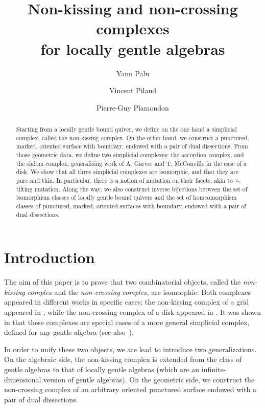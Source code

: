 \documentclass{amsart}
\title[Non-kissing and non-crossing complexes for locally gentle algebras]{Non-kissing and non-crossing complexes \\ for locally gentle algebras}
\author{Yann Palu}
\author{Vincent Pilaud}
\author{Pierre-Guy Plamondon}
\theoremstyle{definition}
\begin{document}
\begin{abstract}
Starting from a locally gentle bound quiver, we define on the one hand a simplicial complex, called the non-kissing complex.
On the other hand, we construct a punctured, marked, oriented surface with boundary, endowed with a pair of dual dissections.
From those geometric data, we define two simplicial complexes: the accordion complex, and the slalom complex, generalising work of A. Garver and T. McConville in the case of a disk.
We show that all three simplicial complexes are isomorphic, and that they are pure and thin.
In particular, there is a notion of mutation on their facets, akin to $\tau$-tilting mutation.
Along the way, we also construct inverse bijections between the set of isomorphism classes of locally gentle bound quivers and the set of homeomorphism classes of punctured, marked, oriented surfaces with boundary, endowed with a pair of dual dissections.
\end{abstract}


\maketitle

\section{Introduction}
The aim of this paper is to prove that two combinatorial objects, called the \emph{non-kissing complex} and the \emph{non-crossing complex}, are isomorphic.
Both complexes appeared in different works in specific cases: the non-kissing complex of a grid appeared in \cite{McConville}, while the non-crossing complex of a disk appeared in \cite{GarverMcConville, MannevillePilaud-accordion}.
It was shown in \cite{PaluPilaudPlamondon} that these complexes are special cases of a more general simplicial complex, defined for any gentle algebra (see also~\cite{BrustleDouvilleMousavandThomasYildirim}).

In order to unify these two objects, we are lead to introduce two generalizations.
On the algebraic side, the non-kissing complex is extended from the class of gentle algebras to that of locally gentle algebras (which are an infinite-dimensional version of gentle algebras).
On the geometric side, we construct the non-crossing complex of an arbitrary oriented punctured surface endowed with a pair of dual dissections.
\end{document}
